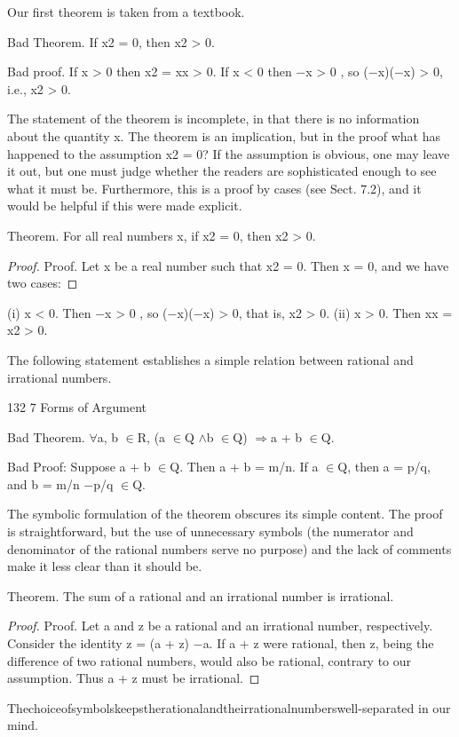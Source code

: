 \documentclass[11pt]{article}
\theoremstyle{plain}
\theoremstyle{definition}
\begin{document}
Our first theorem is taken from a textbook.

Bad Theorem. If x2 = 0, then x2 > 0.

Bad proof. If x > 0 then x2 = xx > 0. If x < 0 then $-$x > 0 , so ($-$x)($-$x) > 0, i.e., x2 > 0. 

The statement of the theorem is incomplete, in that there is no information about the quantity x. The theorem is an implication, but in the proof what has happened to the assumption x2 = 0? If the assumption is obvious, one may leave it out, but one must judge whether the readers are sophisticated enough to see what it must be. Furthermore, this is a proof by cases (see Sect. 7.2), and it would be helpful if this were made explicit.

Theorem. For all real numbers x, if x2 = 0, then x2 > 0.

\begin{proof}
Proof. Let x be a real number such that x2 = 0. Then x = 0, and we have two cases:
\end{proof}

(i) x < 0. Then $-$x > 0 , so ($-$x)($-$x) > 0, that is, x2 > 0. (ii) x > 0. Then xx = x2 > 0. 

The following statement establishes a simple relation between rational and irrational numbers.

132 7 Forms of Argument

Bad Theorem. $\forall$a, b $\in$R, (a $\in$Q $\land$b $\in$Q) $\Rightarrow$a + b $\in$Q.

Bad Proof: Suppose a + b $\in$Q. Then a + b = m/n. If a $\in$Q, then a = p/q, and b = m/n $-$p/q $\in$Q. 

The symbolic formulation of the theorem obscures its simple content. The proof is straightforward, but the use of unnecessary symbols (the numerator and denominator of the rational numbers serve no purpose) and the lack of comments make it less clear than it should be.

Theorem. The sum of a rational and an irrational number is irrational.

\begin{proof}
Proof. Let a and z be a rational and an irrational number, respectively. Consider the identity z = (a + z) $-$a. If a + z were rational, then z, being the difference of two rational numbers, would also be rational, contrary to our assumption. Thus a + z must be irrational. 
\end{proof}

Thechoiceofsymbolskeepstherationalandtheirrationalnumberswell-separated in our mind.
\end{document}
